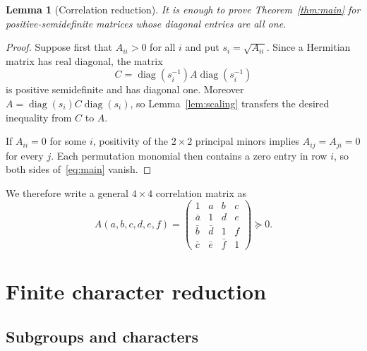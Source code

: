\documentclass[11pt]{article}
\newtheorem{lemma}[theorem]{Lemma}
\theoremstyle{definition}
\newcommand{\diag}{\operatorname{diag}}
\newcommand{\mat}[1]{\begin{pmatrix}#1\end{pmatrix}}
\newcommand{\psd}{\succeq 0}
\begin{document}
\begin{lemma}[Correlation reduction]\label{lem:correlation-reduction}
It is enough to prove Theorem~\ref{thm:main} for positive-semidefinite
matrices whose diagonal entries are all one.
\end{lemma}

\begin{proof}
Suppose first that $A_{ii}>0$ for all $i$ and put
$s_i=\sqrt{A_{ii}}$.  Since a Hermitian matrix has real diagonal, the matrix
\[
 C=\diag(s_i^{-1})A\diag(s_i^{-1})
\]
is positive semidefinite and has diagonal one.  Moreover
$A=\diag(s_i)C\diag(s_i)$, so Lemma~\ref{lem:scaling} transfers the desired
inequality from $C$ to $A$.

If $A_{ii}=0$ for some $i$, positivity of the $2\times2$ principal minors
implies $A_{ij}=A_{ji}=0$ for every $j$.  Each permutation monomial then
contains a zero entry in row $i$, so both sides of~\eqref{eq:main} vanish.
\end{proof}

We therefore write a general $4\times4$ correlation matrix as
\begin{equation}\label{eq:corr-six}
 A(a,b,c,d,e,f)=
 \mat{
 1&a&b&c\\
 \bar a&1&d&e\\
 \bar b&\bar d&1&f\\
 \bar c&\bar e&\bar f&1
 }\psd.
\end{equation}

\section{Finite character reduction}\label{sec:finite-reduction}

\subsection{Subgroups and characters}
\end{document}
